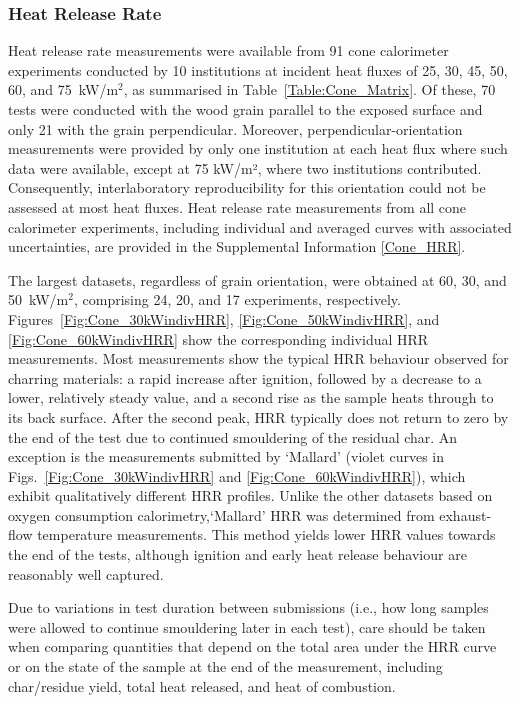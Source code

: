 \documentclass{book}
\begin{document}
\subsubsection{Heat Release Rate}

Heat release rate measurements were available from 91 cone calorimeter experiments conducted by 10 institutions at incident heat fluxes of 25, 30, 45, 50, 60, and 75~kW/m$^2$, as summarised in Table~\ref{Table:Cone_Matrix}. Of these, 70 tests were conducted with the wood grain parallel to the exposed surface and only 21 with the grain perpendicular. Moreover, perpendicular-orientation measurements were provided by only one institution at each heat flux where such data were available, except at 75 kW/m², where two institutions contributed. Consequently, interlaboratory reproducibility for this orientation could not be assessed at most heat fluxes.
Heat release rate measurements from all cone calorimeter experiments, including individual and averaged curves with associated uncertainties, are provided in the Supplemental Information \ref{Cone_HRR}.

The largest datasets, regardless of grain orientation, were obtained at 60, 30, and 50~kW/m$^2$, comprising 24, 20, and 17 experiments, respectively.
Figures~\ref{Fig:Cone_30kWindivHRR}, \ref{Fig:Cone_50kWindivHRR}, and \ref{Fig:Cone_60kWindivHRR} show the corresponding individual HRR measurements.
Most measurements show the typical HRR behaviour observed for charring materials: a rapid increase after ignition, followed by a decrease to a lower, relatively steady value, and a second rise as the sample heats through to its back surface. After the second peak, HRR typically does not return to zero by the end of the test due to continued smouldering of the residual char.
An exception is the measurements submitted by `Mallard' (violet curves in Figs.~\ref{Fig:Cone_30kWindivHRR} and \ref{Fig:Cone_60kWindivHRR}), which exhibit qualitatively different HRR profiles. Unlike the other datasets based on oxygen consumption calorimetry,`Mallard' HRR was determined from exhaust-flow temperature measurements.
This method yields lower HRR values towards the end of the tests, although ignition and early heat release behaviour are reasonably well captured.

Due to variations in test duration between submissions (i.e., how long samples were allowed to continue smouldering later in each test), care should be taken when comparing quantities that depend on the total area under the HRR curve or on the state of the sample at the end of the measurement, including char/residue yield, total heat released, and heat of combustion.
\end{document}
